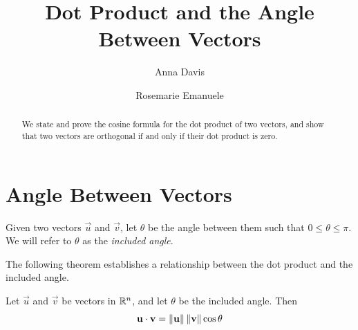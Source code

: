 \documentclass{ximera}
\author{Anna Davis \and Rosemarie Emanuele} \title{Dot Product and the Angle Between Vectors} \license{CC-BY 4.0}
\begin{document}
\begin{abstract}
 We state and prove the cosine formula for the dot product of two vectors, and show that two vectors are orthogonal if and only if their dot product is zero.
\end{abstract}
\maketitle


\section*{Angle Between Vectors} 
Given two vectors $\vec{u}$ and $\vec{v}$, let $\theta$ be the angle between them such that $0\leq\theta\leq \pi$.  We will refer to $\theta$ as the {\it included angle}.

\begin{image}[2in]
\end{image}

The following theorem establishes a relationship between the dot product and the included angle.

  \begin{theorem}\label{th:dotproductcosine} Let $\vec{u}$ and $\vec{v}$ be vectors in $\mathbb{R}^n$, and let $\theta$ be the included angle.  Then
  \begin{equation*} \label{matlintrans}
 \mathbf{u}\cdot\mathbf{v}=\left\lVert\mathbf{u}\right\rVert\left\lVert\mathbf{v}\right\rVert\cos \theta
\end{equation*}
\end{theorem}
\end{document}
